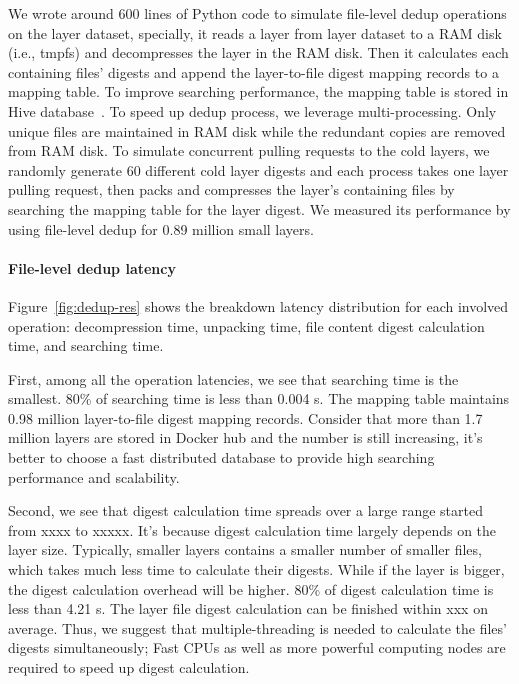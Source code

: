 We wrote around 600 lines of Python code to simulate file-level dedup operations on the layer dataset, specially, it reads a layer from layer dataset to a RAM disk (i.e., tmpfs) and decompresses the layer in the RAM disk. Then it calculates each containing files' digests and append the layer-to-file digest mapping records to a mapping table. To improve searching performance, the mapping table is stored in Hive database~\cite{xxx}. To speed up dedup process, we leverage multi-processing. Only unique files are maintained in RAM disk while the redundant copies are removed from RAM disk. To simulate concurrent pulling requests to the cold layers, we randomly generate 60 different cold layer digests and each process takes one layer pulling request, then packs and compresses the layer's containing files by searching the mapping table for the layer digest. We measured its performance by using file-level dedup for 0.89 million small layers.

\paragraph{File-level dedup latency}

%
Figure~\ref{fig:dedup-res} shows the breakdown latency distribution for each involved operation: decompression time, unpacking time, file content digest calculation time, and searching time.

First, among all the operation latencies, we see that searching time is the smallest. 80\% of searching time is less than 0.004 s. The mapping table maintains 0.98 million layer-to-file digest mapping records. Consider that more than 1.7 million layers are stored in Docker hub and the number is still increasing, it's better to choose a fast distributed database to provide high searching performance and scalability.
  
Second, we see that digest calculation time spreads over a large range started from xxxx to xxxxx. It's because digest calculation time largely depends on the layer size. Typically, smaller layers contains a smaller number of smaller files, which takes much less time to calculate their digests. While if the layer is bigger, the digest calculation overhead will be higher. 80\% of digest calculation time is less than 4.21 s. The layer file digest calculation can be finished within xxx on average. Thus, we suggest that multiple-threading is needed to calculate the files' digests simultaneously; Fast CPUs as well as more powerful computing nodes are required to speed up digest calculation.

